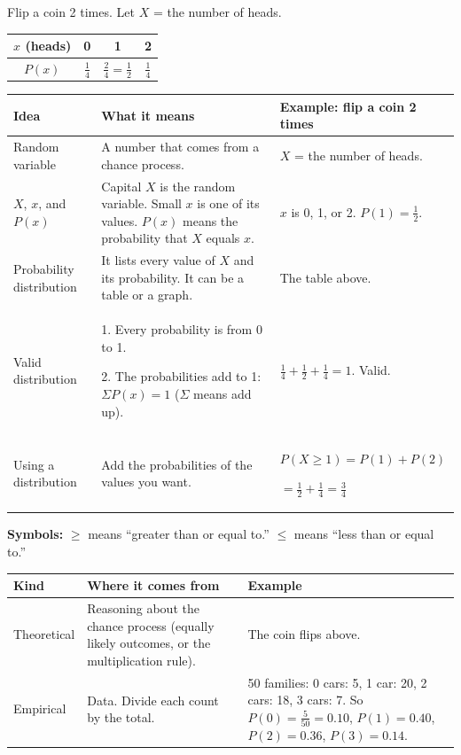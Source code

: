 \documentclass[11pt]{article}
\newcommand{\sumhead}[1]{\par\vspace{0.55em}{\large\bfseries #1}\par\vspace{0.3em}}
\renewcommand{\arraystretch}{1.15}
\newcommand{\disttable}[3][1.25]{{\renewcommand{\arraystretch}{#1}\begin{tabular}{#2}#3\end{tabular}}}
\newlength{\sumtw}
\newcommand{\sumtitle}[1]{\settowidth{\sumtw}{\Large\bfseries #1}%
  \ifdim\sumtw>4.3in \hfill Name \underline{\hspace{2in}}\par\vspace{0.5em}{\Large\bfseries #1}\par\vspace{0.6em}%
  \else {\Large\bfseries #1}\hfill Name \underline{\hspace{2in}}\par\vspace{0.6em}\fi}
\begin{document}
\sumtitle{Unit 7 Summary: Probability Distributions}

\sumhead{Random Variables and Distributions}
Flip a coin 2 times. Let $X$ = the number of heads. \qquad
\disttable[1.5]{|c|c|c|c|}{\hline
$x$ (heads) & 0 & 1 & 2\\ \hline
$P(x)$ & $\frac{1}{4}$ & $\frac{2}{4} = \frac{1}{2}$ & $\frac{1}{4}$\\ \hline}

\vspace{0.5em}
\begin{tabular}{|L{1.4in}|L{2.5in}|L{2.55in}|}\hline
\textbf{Idea} & \textbf{What it means} & \textbf{Example: flip a coin 2 times}\\ \hline
Random variable & A number that comes from a chance process. & $X$ = the number of heads.\\ \hline
$X$, $x$, and $P(x)$ & Capital $X$ is the random variable. Small $x$ is one of its values. $P(x)$ means the probability that $X$ equals $x$. & $x$ is 0, 1, or 2. \; $P(1) = \frac{1}{2}$.\\ \hline
Probability distribution & It lists every value of $X$ and its probability. It can be a table or a graph. & The table above.\\ \hline
Valid distribution & 1. Every probability is from 0 to 1.\par 2. The probabilities add to 1: $\Sigma P(x) = 1$ ($\Sigma$ means add up). & $\frac{1}{4} + \frac{1}{2} + \frac{1}{4} = 1$. Valid.\\ \hline
Using a distribution & Add the probabilities of the values you want. & $P(X \ge 1) = P(1) + P(2)$\par $= \frac{1}{2} + \frac{1}{4} = \frac{3}{4}$\\[0.2em] \hline
\end{tabular}

\vspace{0.3em}
\textbf{Symbols:} $\ge$ means ``greater than or equal to.'' \quad $\le$ means ``less than or equal to.''

\sumhead{Theoretical or Empirical?}
\begin{tabular}{|L{1.4in}|L{2.5in}|L{2.55in}|}\hline
\textbf{Kind} & \textbf{Where it comes from} & \textbf{Example}\\ \hline
Theoretical & Reasoning about the chance process (equally likely outcomes, or the multiplication rule). & The coin flips above.\\ \hline
Empirical & Data. Divide each count by the total. & 50 families: 0 cars: 5, 1 car: 20, 2 cars: 18, 3 cars: 7. So $P(0) = \frac{5}{50} = 0.10$, $P(1) = 0.40$, $P(2) = 0.36$, $P(3) = 0.14$.\\[0.2em] \hline
\end{tabular}
\end{document}
